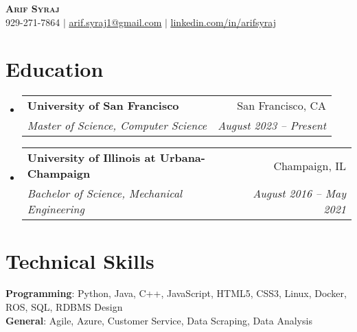 \documentclass[letterpaper,11pt]{article}
\makeatletter
\newcommand{\resumeSubheading}[4]{
  \vspace{-2pt}\item
    \begin{tabular*}{0.97\textwidth}[t]{l@{\extracolsep{\fill}}r}
      \textbf{#1} & #2 \\
      \textit{\small#3} & \textit{\small #4} \\
    \end{tabular*}\vspace{-7pt}
}
\newcommand{\resumeSubHeadingListStart}
{\begin{itemize}[leftmargin=0.15in, label={}]}
\newcommand{\resumeSubHeadingListEnd}{\end{itemize}}
\makeatother
\begin{document}

\begin{center}
  \textbf{\Huge \scshape Arif Syraj} \\ \vspace{1pt}
  \small 929-271-7864 $|$ \href{mailto:x@x.com}{\underline{arif.syraj1@gmail.com}} $|$
  \href{https://linkedin.com/in/...}{\underline{linkedin.com/in/arifsyraj}} %
\end{center}


\section{Education}
\resumeSubHeadingListStart
\resumeSubheading
{University of San Francisco}{San Francisco, CA}
{Master of Science, Computer Science}{August 2023 -- Present}
\resumeSubheading
{University of Illinois at Urbana-Champaign}{Champaign, IL}
{Bachelor of Science, Mechanical Engineering}{August 2016 -- May 2021}

\resumeSubHeadingListEnd


%
\section{Technical Skills}
\begin{itemize}[leftmargin=0.15in, label={}]
  \small{\item{
        \textbf{Programming}{: Python, Java, C++, JavaScript, HTML5, CSS3, Linux, Docker, ROS, SQL, RDBMS Design} \\
        \textbf{General}{: Agile, Azure, Customer Service, Data Scraping, Data Analysis}
        }}
\end{itemize}
\end{document}
